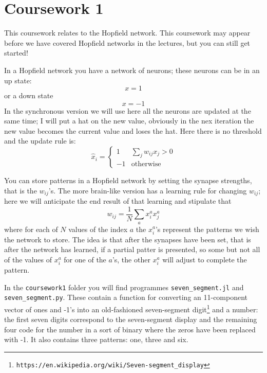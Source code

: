 \documentclass[12pt]{article}
\begin{document}
\section*{Coursework 1}

This coursework relates to the Hopfield network. This coursework may
appear before we have covered Hopfield networks in the lectures, but
you can still get started!

In a Hopfield network you have a network of
neurons; these neurons can be in an up state:
\begin{equation}
  x=1
\end{equation}
or a down state
\begin{equation}
  x=-1
\end{equation}
In the synchronous version we will use here all the neurons are
updated at the same time; I will put a hat on the new value, obviously
in the nex iteration the new value becomes the current value and loses
the hat. Here there is no threshold and the update rule is:
\begin{equation}
  \hat{x}_i=\left\{\begin{array}{ll}1&\sum_j w_{ij}x_j>0\\-1&\text{otherwise}\end{array}\right.
\end{equation}

You can store patterns in a Hopfield network by setting the synapse
strengths, that is the $w_{ij}$'s. The more brain-like version has a
learning rule for changing $w_{ij}$; here we will anticipate the end
result of that learning and stipulate that
\begin{equation}
w_{ij}=\frac{1}{N}\sum_a x_i^a x_j^a
\end{equation}
where for each of $N$ values of the index $a$ the $x_i^a$'s represent
the patterns we wish the network to store. The idea is that after the
synapses have been set, that is after the network has learned, if a
partial patter is presented, so some but not all of the values of
$x_i^a$ for one of the $a$'s, the other $x_i^a$ will adjust to
complete the pattern.



In the \texttt{coursework1} folder you will find programmes
\texttt{seven\_segment.jl} and \texttt{seven\_segment.py}. These
contain a function for converting an 11-component vector of ones and
-1's into an old-fashioned seven-segment
digit\footnote{\texttt{https://en.wikipedia.org/wiki/Seven-segment\_display}}
and a number: the first seven digits correspond to the seven-segment
display and the remaining four code for the number in a sort of binary
where the zeros have been replaced with -1. It also contains three
patterns: one, three and six.
\end{document}
